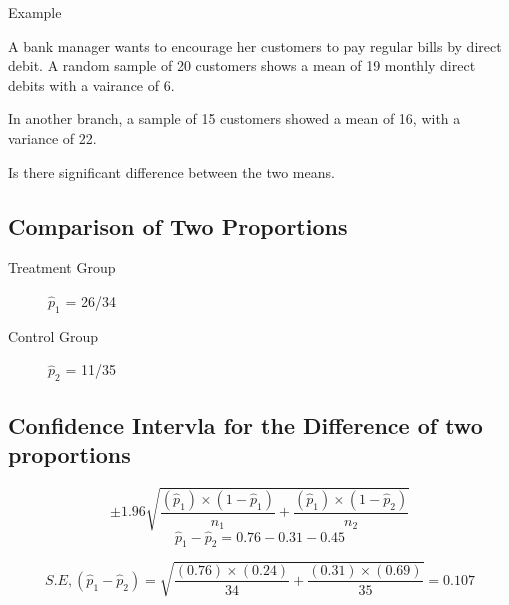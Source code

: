 Example

A bank manager wants to encourage her customers to pay regular bills by direct debit. A random sample of 20 customers shows a mean of 19 monthly direct
debits with a vairance of 6.

In another branch, a sample of 15 customers showed a mean of 16, with a variance of 22.

Is there significant difference between the two means.


\subsection{Comparison of Two Proportions}

\begin{description}
\item[Treatment Group] $\hat{p}_1$ = 26/34
\item[Control Group] $\hat{p}_2$ = 11/35
\end{description}



\subsection{Confidence Intervla for the Difference of two proportions}


\[ \pm 1.96 \sqrt{  \frac{(\hat{p}_1) \times (1-\hat{p}_1)}{n_1} + \frac{(\hat{p}_1) \times (1 - \hat{p}_2) }{n_2} } \]
\[\hat{p}_1 - \hat{p}_2 = 0.76 - 0.31 - 0.45\]

\[S.E, (\hat{p}_1 - \hat{p}_2) = \sqrt{  \frac{(0.76) \times (0.24)}{34} + \frac{(0.31) \times (0.69) }{35} } = 0.107\]
